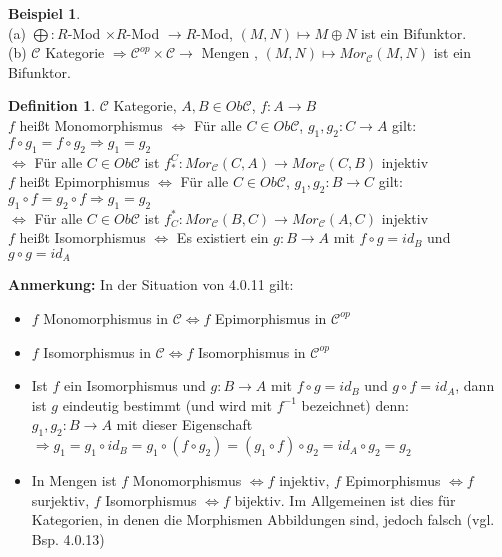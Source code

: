 \documentclass[10pt,a4paper,numbers=endperiod]{scrreprt}
\theoremstyle{definition}
\newtheorem{defi}[satz]{Definition}
\newtheorem{bsp}[satz]{Beispiel}
\begin{document}
\begin{bsp}
	$ $\\
	(a) $\bigoplus: R$-Mod $\times R$-Mod $\rightarrow R$-Mod, $(M,N) \mapsto M \oplus N$ ist ein Bifunktor.\\
	(b) $\mathcal{C}$ Kategorie $\Rightarrow \mathcal{C}^{op} \times \mathcal{C} \rightarrow \text{ Mengen }$, $(M, N) \mapsto Mor_{\mathcal{C}}(M, N)$ ist ein Bifunktor.
\end{bsp}

\begin{defi}
	$\mathcal{C}$ Kategorie, $A, B \in Ob \mathcal{C}$, $f: A \rightarrow B$\\
	$f$ heißt Monomorphismus $\Leftrightarrow$ Für alle $C \in Ob \mathcal{C}$, $g_1, g_2: C \rightarrow A$ gilt: $f \circ g_1 = f \circ g_2 \Rightarrow g_1 = g_2$\\
	\hspace*{37.5mm}$\Leftrightarrow$ Für alle $C \in Ob \mathcal{C}$ ist $f_*^C: Mor_{\mathcal{C}} (C, A) \rightarrow Mor_{\mathcal{C}} (C, B)$ injektiv\\
	$f$ heißt Epimorphismus $\Leftrightarrow$ Für alle $C \in Ob \mathcal{C}$, $g_1, g_2: B \rightarrow C$ gilt: $g_1 \circ f = g_2 \circ f \Rightarrow g_1 = g_2$\\
	\hspace*{34.1mm}$\Leftrightarrow$ Für alle $C \in Ob \mathcal{C}$ ist $f_C^*: Mor_{\mathcal{C}} (B, C) \rightarrow Mor_{\mathcal{C}} (A, C)$ injektiv\\
	$f$ heißt Isomorphismus $\Leftrightarrow$ Es existiert ein $g: B \rightarrow A$ mit $f \circ g = id_B$ und $g \circ g = id_A$
\end{defi}

\textbf{Anmerkung:} In der Situation von 4.0.11 gilt: \begin{itemize}
	\item $f$ Monomorphismus in $\mathcal{C} \Leftrightarrow f$ Epimorphismus in $\mathcal{C}^{op}$
	\item $f$ Isomorphismus in $\mathcal{C} \Leftrightarrow f$ Isomorphismus in $\mathcal{C}^{op}$
	\item Ist $f$ ein Isomorphismus und $g: B \rightarrow A$ mit $f \circ g = id_B$ und $g \circ f = id_A$, dann ist $g$ eindeutig bestimmt (und wird mit $f^{-1}$ bezeichnet) denn:\\
	$g_1, g_2: B \rightarrow A$ mit dieser Eigenschaft $\Rightarrow g_1 = g_1 \circ id_B = g_1 \circ (f \circ g_2) = (g_1 \circ f) \circ g_2 = id_A \circ g_2 = g_2$
	\item In Mengen ist $f$ Monomorphismus $\Leftrightarrow f$ injektiv, $f$ Epimorphismus $\Leftrightarrow f$ surjektiv, $f$ Isomorphismus $\Leftrightarrow f$ bijektiv. Im Allgemeinen ist dies für Kategorien, in denen die Morphismen Abbildungen sind, jedoch falsch (vgl. Bsp. 4.0.13)
\end{itemize}
\end{document}
